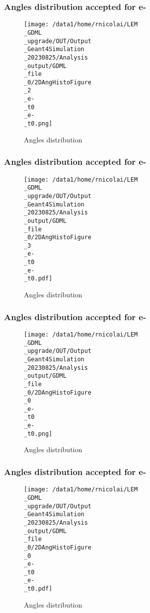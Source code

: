\documentclass[8pt]{beamer}
\begin{document}
            \begin{frame}
                \frametitle{Angles distribution accepted for e-}
            
        \begin{figure}[h]
            \centering
            \texttt{[image: /data1/home/rnicolai/LEM\\\_GDML\\\_upgrade/OUT/Output\\\_Geant4Simulation\\\_20230825/Analysis\\\_output/GDML\\\_file\\\_0/2DAngHistoFigure\\\_2\\\_e-\\\_t0\\\_e-\\\_t0.png]}
            \caption{Angles distribution}
        \end{figure}
        
            \end{frame}
            
            \begin{frame}
                \frametitle{Angles distribution accepted for e-}
            
        \begin{figure}[h]
            \centering
            \texttt{[image: /data1/home/rnicolai/LEM\\\_GDML\\\_upgrade/OUT/Output\\\_Geant4Simulation\\\_20230825/Analysis\\\_output/GDML\\\_file\\\_0/2DAngHistoFigure\\\_3\\\_e-\\\_t0\\\_e-\\\_t0.pdf]}
            \caption{Angles distribution}
        \end{figure}
        
            \end{frame}
            
            \begin{frame}
                \frametitle{Angles distribution accepted for e-}
            
        \begin{figure}[h]
            \centering
            \texttt{[image: /data1/home/rnicolai/LEM\\\_GDML\\\_upgrade/OUT/Output\\\_Geant4Simulation\\\_20230825/Analysis\\\_output/GDML\\\_file\\\_0/2DAngHistoFigure\\\_0\\\_e-\\\_t0\\\_e-\\\_t0.png]}
            \caption{Angles distribution}
        \end{figure}
        
            \end{frame}
            
            \begin{frame}
                \frametitle{Angles distribution accepted for e-}
            
        \begin{figure}[h]
            \centering
            \texttt{[image: /data1/home/rnicolai/LEM\\\_GDML\\\_upgrade/OUT/Output\\\_Geant4Simulation\\\_20230825/Analysis\\\_output/GDML\\\_file\\\_0/2DAngHistoFigure\\\_0\\\_e-\\\_t0\\\_e-\\\_t0.pdf]}
            \caption{Angles distribution}
        \end{figure}
        
            \end{frame}
            
\end{document}
